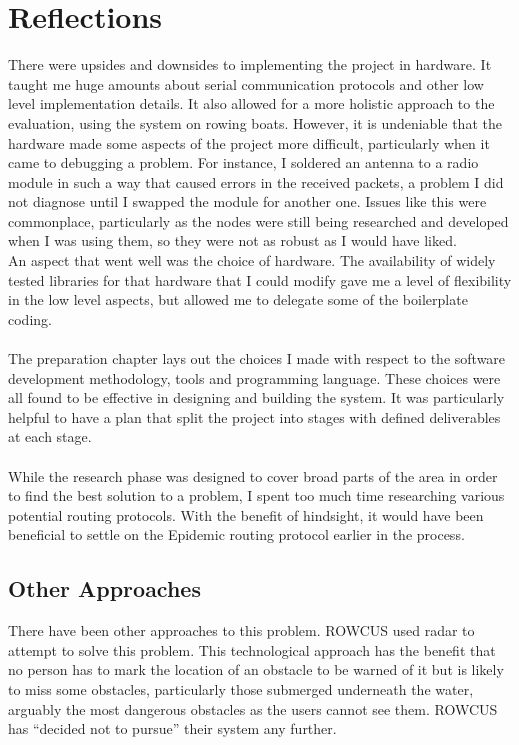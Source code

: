 \documentclass[12pt,a4paper]{report}
\begin{document}
{\section{Reflections}
There were upsides and downsides to implementing the project in hardware. It taught me huge amounts about serial communication protocols and other low level implementation details. It also allowed for a more holistic approach to the evaluation, using the system on rowing boats. However, it is undeniable that the hardware made some aspects of the project more difficult, particularly when it came to debugging a problem. For instance, I soldered an antenna to a radio module in such a way that caused errors in the received packets, a problem I did not diagnose until I swapped the module for another one. Issues like this were commonplace, particularly as the nodes were still being researched and developed when I was using them, so they were not as robust as I would have liked. \\
An aspect that went well was the choice of hardware. The availability of widely tested libraries for that hardware that I could modify gave me a level of flexibility in the low level aspects, but allowed me to delegate some of the boilerplate coding. \\ \\
The preparation chapter lays out the choices I made with respect to the software development methodology, tools and programming language. These choices were all found to be effective in designing and building the system. It was particularly helpful to have a plan that split the project into stages with defined deliverables at each stage. \\ \\ 
While the research phase was designed to cover broad parts of the area in order to find the best solution to a problem, I spent too much time researching various potential routing protocols. With the benefit of hindsight, it would have been beneficial to settle on the Epidemic routing protocol earlier in the process. \\

\subsection{Other Approaches}
There have been other approaches to this problem. ROWCUS used radar to attempt to solve this problem. This technological approach has the benefit that no person has to mark the location of an obstacle to be warned of it but is likely to miss some obstacles, particularly those submerged underneath the water, arguably the most dangerous obstacles as the users cannot see them. ROWCUS has ``decided not to pursue'' their system any further. \\

}
\end{document}
